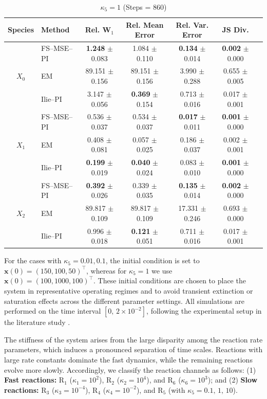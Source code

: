 \documentclass{article}
\begin{document}
\begin{table}[htpb]
\begin{subtable}{\textwidth}
\centering
\caption{$\kappa_5 = 1$ (Steps = 860)}
\begin{tabular}{clccccc}
\toprule
Species & Method & Rel. W$_1$ & Rel. Mean Error & Rel. Var. Error & JS Div.\\
\midrule
\multirow{3}{*}{$X_0$}
& FS–MSE–PI
& \textbf{1.248} $\pm$ 0.083
& 1.084 $\pm$ 0.110
& \textbf{0.134} $\pm$ 0.014
& \textbf{0.002} $\pm$ 0.000\\
& EM
& 89.151 $\pm$ 0.156
& 89.151 $\pm$ 0.156
& 3.990 $\pm$ 0.288
& 0.655 $\pm$ 0.005 \\
& Ilie--PI
& 3.147 $\pm$ 0.056
& \textbf{0.369} $\pm$ 0.154
& 0.713 $\pm$ 0.016
& 0.017 $\pm$ 0.001\\
\midrule
\multirow{3}{*}{$X_1$}
& FS–MSE–PI
& 0.536 $\pm$ 0.037
& 0.534 $\pm$ 0.037
& \textbf{0.017} $\pm$ 0.011
& \textbf{0.001} $\pm$ 0.000\\
& EM
& 0.408 $\pm$ 0.081
& 0.057 $\pm$ 0.025
& 0.186 $\pm$ 0.037
& 0.002 $\pm$ 0.001\\
& Ilie--PI
& \textbf{0.199} $\pm$ 0.019
& \textbf{0.040} $\pm$ 0.024
& 0.083 $\pm$ 0.010
& \textbf{0.001} $\pm$ 0.000\\
\midrule
\multirow{3}{*}{$X_2$}
& FS–MSE–PI
& \textbf{0.392} $\pm$ 0.026
& 0.339 $\pm$ 0.035
& \textbf{0.135} $\pm$ 0.014
& \textbf{0.002} $\pm$ 0.000\\
& EM
& 89.817 $\pm$ 0.109
& 89.817 $\pm$ 0.109
& 17.331 $\pm$ 0.246
& 0.693 $\pm$ 0.000\\
& Ilie--PI
& 0.996 $\pm$ 0.018
& \textbf{0.121} $\pm$ 0.051
& 0.711 $\pm$ 0.016
& 0.017 $\pm$ 0.001\\
\bottomrule
\end{tabular}
\end{subtable}

\end{table}

For the cases with $\kappa_5=0.01,0.1$, the initial condition is set to
$\pmb{x}(0)=(150,100,50)^\top$, whereas for $\kappa_5=1$ we use
$\pmb{x}(0)=(100,1000,100)^\top$.
These initial conditions are chosen to place the system in representative
operating regimes and to avoid transient extinction or saturation effects
across the different parameter settings.
All simulations are performed on the time interval $[0,\,2\times10^{-2}]$, following the experimental setup in the literature study \cite{ilie2015adaptive}.

The stiffness of the system arises from the large disparity among the reaction rate parameters, which induces a pronounced separation of time scales.
Reactions with large rate constants dominate the fast dynamics, while the remaining reactions evolve more slowly. Accordingly, we classify the reaction channels as follows: (1) \textbf{Fast reactions:}
$\mathrm{R}_1$ ($\kappa_1=10^2$), $\mathrm{R}_2$ ($\kappa_2=10^4$), and $\mathrm{R}_6$ ($\kappa_6=10^3$); and (2) \textbf{Slow reactions:}
$\mathrm{R}_3$ ($\kappa_3=10^{-4}$), $\mathrm{R}_4$ ($\kappa_4=10^{-2}$), and $\mathrm{R}_5$ (with $\kappa_5=0.1,\,1,\,10$).
\end{document}
